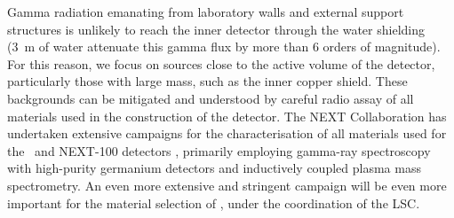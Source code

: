\indent

Gamma radiation emanating from laboratory walls and external support structures is unlikely to reach the inner detector through the water shielding (3~m of water attenuate this gamma flux by more than 6 orders of magnitude). For this reason, we focus on sources close to the active volume of the detector, particularly those with large mass, such as the inner copper shield. These backgrounds can be mitigated and understood by careful radio assay of all materials used in the construction of the detector. The NEXT Collaboration has undertaken extensive campaigns for the characterisation of all materials used for the \NEW\ and NEXT-100 detectors \cite{Alvarez:2012as, Cebrian:2017jzb}, primarily employing gamma-ray spectroscopy with high-purity germanium detectors and inductively coupled plasma mass spectrometry. An even more extensive and stringent campaign will be even more important for the material selection of \NHD, under the coordination of the LSC.  



\indent

